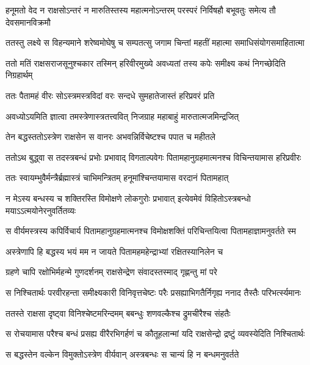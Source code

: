 \twolineshloka
{हनूमतो वेद न राक्षसोऽन्तरं न मारुतिस्तस्य महात्मनोऽन्तरम्}
{परस्परं निर्विषहौ बभूवतुः समेत्य तौ देवसमानविक्रमौ} %

\twolineshloka
{ततस्तु लक्ष्ये स विहन्यमाने शरेष्वमोघेषु च सम्पतत्सु}
{जगाम चिन्तां महतीं महात्मा समाधिसंयोगसमाहितात्मा} %

\twolineshloka
{ततो मतिं राक्षसराजसूनुश्चकार तस्मिन् हरिवीरमुख्ये}
{अवध्यतां तस्य कपेः समीक्ष्य कथं निगच्छेदिति निग्रहार्थम्} %

\twolineshloka
{ततः पैतामहं वीरः सोऽस्त्रमस्त्रविदां वरः}
{सन्दधे सुमहातेजास्तं हरिप्रवरं प्रति} %

\twolineshloka
{अवध्योऽयमिति ज्ञात्वा तमस्त्रेणास्त्रतत्त्ववित्}
{निजग्राह महाबाहुं मारुतात्मजमिन्द्रजित्} %

\twolineshloka
{तेन बद्धस्ततोऽस्त्रेण राक्षसेन स वानरः}
{अभवन्निर्विचेष्टश्च पपात च महीतले} %

\twolineshloka
{ततोऽथ बुद्ध्वा स तदस्त्रबन्धं प्रभोः प्रभावाद् विगताल्पवेगः}
{पितामहानुग्रहमात्मनश्च विचिन्तयामास हरिप्रवीरः} %

\twolineshloka
{ततः स्वायम्भुवैर्मन्त्रैर्ब्रह्मास्त्रं चाभिमन्त्रितम्}
{हनूमांश्चिन्तयामास वरदानं पितामहात्} %

\twolineshloka
{न मेऽस्य बन्धस्य च शक्तिरस्ति विमोक्षणे लोकगुरोः प्रभावात्}
{इत्येवमेवं विहितोऽस्त्रबन्धो मयाऽऽत्मयोनेरनुवर्तितव्यः} %

\twolineshloka
{स वीर्यमस्त्रस्य कपिर्विचार्य पितामहानुग्रहमात्मनश्च}
{विमोक्षशक्तिं परिचिन्तयित्वा पितामहाज्ञामनुवर्तते स्म} %

\twolineshloka
{अस्त्रेणापि हि बद्धस्य भयं मम न जायते}
{पितामहमहेन्द्राभ्यां रक्षितस्यानिलेन च} %

\twolineshloka
{ग्रहणे चापि रक्षोभिर्महन्मे गुणदर्शनम्}
{राक्षसेन्द्रेण संवादस्तस्माद् गृह्णन्तु मां परे} %

\twolineshloka
{स निश्चितार्थः परवीरहन्ता समीक्ष्यकारी विनिवृत्तचेष्टः}
{परैः प्रसह्याभिगतैर्निगृह्य ननाद तैस्तैः परिभर्त्स्यमानः} %

\twolineshloka
{ततस्ते राक्षसा दृष्ट्वा विनिश्चेष्टमरिन्दमम्}
{बबन्धुः शणवल्कैश्च द्रुमचीरैश्च संहतैः} %

\twolineshloka
{स रोचयामास परैश्च बन्धं प्रसह्य वीरैरभिगर्हणं च}
{कौतूहलान्मां यदि राक्षसेन्द्रो द्रष्टुं व्यवस्येदिति निश्चितार्थः} %

\twolineshloka
{स बद्धस्तेन वल्केन विमुक्तोऽस्त्रेण वीर्यवान्}
{अस्त्रबन्धः स चान्यं हि न बन्धमनुवर्तते} %

